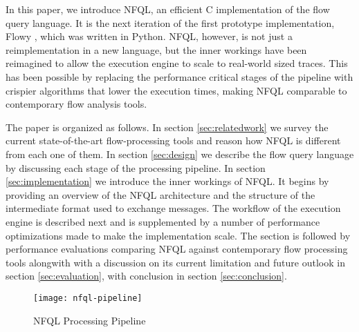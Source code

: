 In this paper, we introduce \ac{NFQL}, an efficient C implementation of the
flow query language. It is the next iteration of the first prototype
implementation, Flowy \cite{kkanev:2010}, which was written in Python.
\ac{NFQL}, however, is not just a reimplementation in a new language, but the
inner workings have been reimagined to allow the execution engine to scale to
real-world sized traces. This has been possible by replacing the performance
critical stages of the pipeline with crispier algorithms that lower the
execution times, making \ac{NFQL} comparable to contemporary flow analysis
tools.

The paper is organized as follows. In section \ref{sec:relatedwork} we survey
the current state-of-the-art flow-processing tools and reason how \ac{NFQL} is
different from each one of them. In section \ref{sec:design} we describe the
flow query language by discussing each stage of the processing pipeline. In
section \ref{sec:implementation} we introduce the inner workings of \ac{NFQL}.
It begins by providing an overview of the \ac{NFQL} architecture and the
structure of the intermediate format used to exchange messages. The workflow
of the execution engine is described next and is supplemented by a number of
performance optimizations made to make the implementation scale. The section
is followed by performance evaluations comparing \ac{NFQL} against
contemporary flow processing tools alongwith with a discussion on its current
limitation and future outlook in section \ref{sec:evaluation}, with conclusion
in section \ref{sec:conclusion}.

\begin{figure*}[!t]
\centering
\texttt{[image: nfql-pipeline]}
\caption{NFQL Processing Pipeline \cite{vmarinov:2009}}
\label{fig:nfql-pipeline}
\end{figure*}

